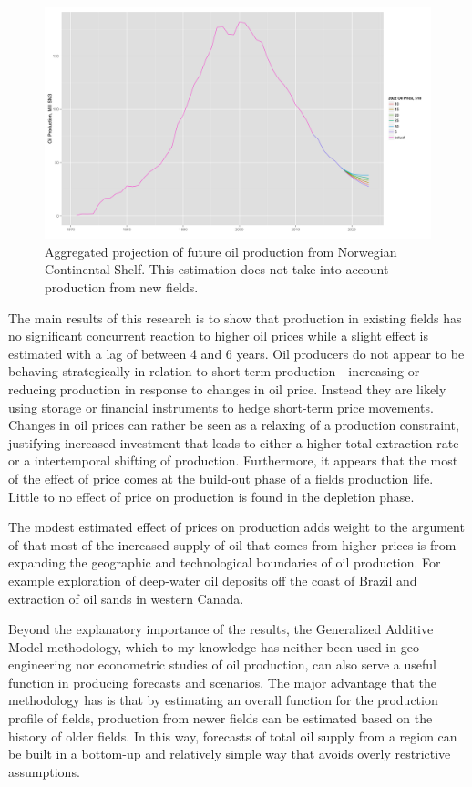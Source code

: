 \documentclass[12pt]{article}
\begin{document}
\begin{figure}
	\includegraphics[width=1\textwidth]{figures/tot_forecast_print.png}
	\caption{Aggregated projection of future oil production from Norwegian Continental Shelf.  This estimation does not take into account production from new fields.}
	\label{tot_forecast}
\end{figure}


The main results of this research is to show that production in existing fields has no significant concurrent reaction to higher oil prices while a slight effect is estimated  with a lag of between 4 and 6 years.  Oil producers do not appear to be behaving strategically in relation to short-term production - increasing or reducing production in response to changes in oil price.  Instead they are likely using storage or financial instruments to hedge short-term price movements. Changes in oil prices can rather be seen as a relaxing of a production constraint, justifying increased investment that leads to either a higher total extraction rate or a intertemporal shifting of production. Furthermore, it appears that the most of the effect of price comes at the build-out phase of a fields production life.  Little to no effect of price on production is found in the depletion phase.

The modest estimated effect of prices on production adds weight to the argument of \citet{hamilton_oil_2012} that most of the increased supply of oil that comes from higher prices is from expanding the geographic and technological boundaries of oil production.  For example exploration of deep-water oil deposits off the coast of Brazil and extraction of oil sands in western Canada.  

Beyond the explanatory importance of the results, the Generalized Additive Model methodology, which to my knowledge has neither been used in geo-engineering nor econometric studies of oil production, can also serve a useful function in producing forecasts and scenarios.  The major advantage that the methodology has is that by estimating an overall function for the production profile of fields, production from newer fields can be estimated based on the history of older fields.  In this way, forecasts of total oil supply from a region can be built in a bottom-up and relatively simple way that avoids overly restrictive assumptions. 
\end{document}
